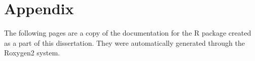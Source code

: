 \documentclass[11pt, a4paper, oneside]{report}
\begin{document}
\chapter{Appendix}
\label{cha:appendix}

The following pages are a copy of the documentation for the R package
created as a part of this dissertation. They were automatically
generated through the Roxygen2 system.



{}
\printglossaries
{}
\printindex
{}
\printbibliography
\end{document}
